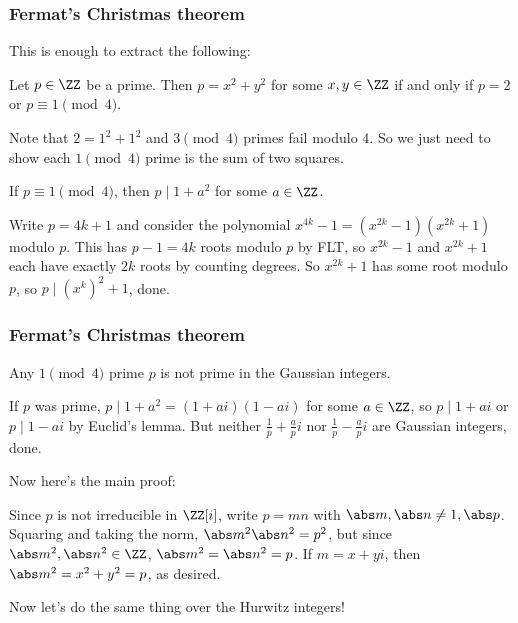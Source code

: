 \documentclass{beamer}
\begin{document}
\begin{frame}
	\frametitle{Fermat's Christmas theorem}
	This is enough to extract the following:

	\begin{theorem}
		Let $p \in \ZZ$ be a prime. Then $p = x^2 + y^2$ for some $x,y \in \ZZ$ if and only if $p = 2$ or $p \equiv 1 \pmod 4$.
	\end{theorem}

	Note that $2 = 1^2 + 1^2$ and $3 \pmod 4$ primes fail modulo $4$. So we just need to show each $1 \pmod 4$ prime is the sum of two squares.

	\begin{lemma}
		If $p \equiv 1 \pmod 4$, then $p \mid 1 + a^2$ for some $a \in \ZZ$.
	\end{lemma}

	\begin{itemize}
		\ii Write $p = 4k + 1$ and consider the polynomial $x^{4k} - 1 = (x^{2k} - 1)(x^{2k} + 1)$ modulo $p$.
		\ii This has $p - 1 = 4k$ roots modulo $p$ by FLT, so $x^{2k} - 1$ and $x^{2k} + 1$ each have exactly $2k$ roots by counting degrees.
		\ii So $x^{2k} + 1$ has some root modulo $p$, so $p \mid (x^k)^2 + 1$, done.
	\end{itemize}
\end{frame}

\begin{frame}
	\frametitle{Fermat's Christmas theorem}
	\begin{lemma}
		Any $1 \pmod 4$ prime $p$ is \alert{not} prime in the Gaussian integers.
	\end{lemma}

	\begin{itemize}
		\ii If $p$ was prime, $p \mid 1 + a^2 = (1 + ai)(1 - ai)$ for some $a \in \ZZ$, so $p \mid 1 + ai$ or $p \mid 1 - ai$ by Euclid's lemma.
		\ii But neither $\frac1p + \frac api$ nor $\frac1p - \frac api$ are Gaussian integers, done.
	\end{itemize}

	\medskip

	Now here's the main proof:

	\begin{itemize}
		\ii Since $p$ is not irreducible in $\ZZ[i]$, write $p = mn$ with $\abs m,\abs n \neq 1,\abs p$.
		\ii Squaring and taking the norm, $\abs m^2\abs n^2 = p^2$, but since $\abs m^2,\abs n^2 \in \ZZ$, $\abs m^2 = \abs n^2 = p$.
		\ii If $m = x + yi$, then $\abs m^2 = x^2 + y^2 = p$, as desired.
	\end{itemize}
	Now let's do the same thing over the Hurwitz integers!
\end{frame}
\end{document}

